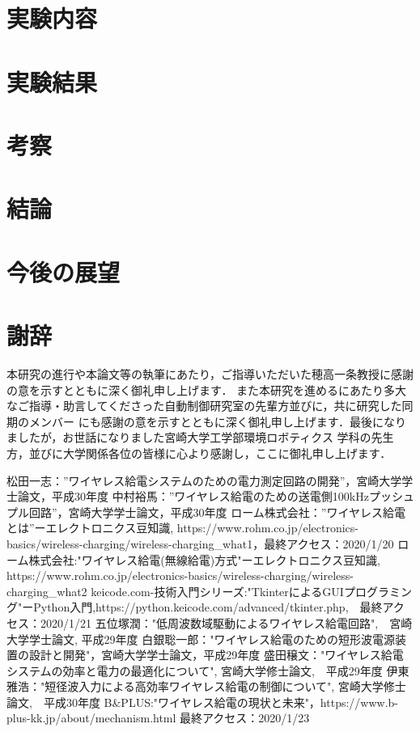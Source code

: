 \documentclass[12pt]{jarticle}
\begin{document}
\section{実験内容}

\section{実験結果}

\section{考察}

\section{結論}

\section{今後の展望}

\clearpage
\section{謝辞}
 本研究の進行や本論文等の執筆にあたり，ご指導いただいた穂高一条教授に感謝の意を示すとともに深く御礼申し上げます．
また本研究を進めるにあたり多大なご指導・助言してくださった自動制御研究室の先輩方並びに，共に研究した同期のメンバー
にも感謝の意を示すとともに深く御礼申し上げます．最後になりましたが，お世話になりました宮崎大学工学部環境ロボティクス
学科の先生方，並びに大学関係各位の皆様に心より感謝し，ここに御礼申し上げます．

\begin{thebibliography}{50}
	松田一志：”ワイヤレス給電システムのための電力測定回路の開発”，宮崎大学学士論文，平成30年度
	中村裕馬：”ワイヤレス給電のための送電側100kHzプッシュプル回路”，宮崎大学学士論文，平成30年度
	ローム株式会社：”ワイヤレス給電とは”ーエレクトロニクス豆知識, https://www.rohm.co.jp/electronics-basics/wireless-charging/wireless-charging\_what1，最終アクセス：2020/1/20
	ローム株式会社:"ワイヤレス給電(無線給電)方式"ーエレクトロニクス豆知識, https://www.rohm.co.jp/electronics-basics/wireless-charging/wireless-charging\_what2
	keicode.com-技術入門シリーズ:"TkinterによるGUIプログラミング"ーPython入門,https://python.keicode.com/advanced/tkinter.php,　最終アクセス：2020/1/21
	五位塚潤："低周波数域駆動によるワイヤレス給電回路",　宮崎大学学士論文, 平成29年度
	白銀聡一郎："ワイヤレス給電のための短形波電源装置の設計と開発"，宮崎大学学士論文，平成29年度
	盛田穣文："ワイヤレス給電システムの効率と電力の最適化について", 宮崎大学修士論文,　平成29年度
	伊東雅浩："短径波入力による高効率ワイヤレス給電の制御について", 宮崎大学修士論文,　平成30年度
	B\&PLUS:"ワイヤレス給電の現状と未来"，https://www.b-plus-kk.jp/about/mechanism.html 最終アクセス：2020/1/23
\end{thebibliography}
\clearpage
\end{document}
